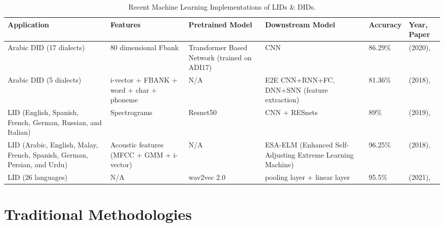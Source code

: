 \begin{table}[hbt!]
    \begin{center}
    \begin{tabular}{|m{3cm} | m{2.5cm} | m{2cm} |  m{3cm} |  m{1.7cm} | m{2cm} |}
        \hline
        \textbf{Application} & \textbf{Features} & \textbf{Pretrained Model} & \textbf{Downstream Model} &\textbf{Accuracy} &\textbf{Year, Paper}\\
        \hline
        Arabic DID \newline(17 dialects) & 80 dimensional Fbank & 
        Transformer Based Network (trained on ADI17) & CNN & 86.29\% & (2020), \cite{lin_transformer-based_2020} \\
        \hline
        Arabic DID \newline(5 dialects) & i-vector + FBANK + \newline word + \newline char + \newline phoneme & 
        N/A & E2E CNN+RNN+FC, DNN+SNN (feature extraction) & 81.36\% & (2018), \cite{shon_convolutional_2018} \\
        \hline
        LID (English, Spanish, French, German, Russian, and Italian) & Spectrograms & 
        Resnet50 & CNN + RESnets & 89\% & (2019), \cite{salameh_fine-grained_2018}\\
        \hline
        LID (Arabic, English, Malay, French, Spanish, German, Persian, and Urdu) & 
        Acoustic features (MFCC + GMM + i-vector) & N/A & ESA-ELM (Enhanced Self- Adjusting Extreme Learning Machine) 
        & 96.25\% & (2018), \cite{tjandra_improved_2021}\\
        \hline
        LID \newline(26 languages) & N/A & wav2vec 2.0 & pooling layer + linear layer & 95.5\% & (2021), \cite{mohamed_arabic_2021}\\
        \hline
    \end{tabular}
    \caption{Recent Machine Learning Implementations of LIDs \& DIDs.}
    \label{tab:MLapplications}
    \end{center}
\end{table}

\pagebreak
\section{Traditional Methodologies}
